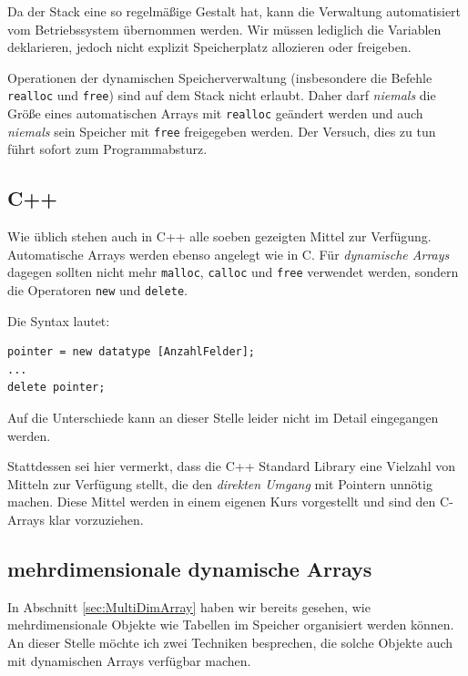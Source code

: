 Da der Stack eine so regelmäßige Gestalt hat, kann die Verwaltung automatisiert vom Betriebssystem übernommen werden. Wir müssen lediglich die Variablen deklarieren, jedoch nicht explizit Speicherplatz allozieren oder freigeben.

\begin{warnbox}
Operationen der dynamischen Speicherverwaltung (insbesondere die Befehle \texttt{realloc} und \texttt{free}) sind auf dem Stack nicht erlaubt. Daher darf \emph{niemals} die Größe eines automatischen Arrays mit \texttt{realloc} geändert werden und auch \emph{niemals} sein Speicher mit \texttt{free} freigegeben werden. Der Versuch, dies zu tun führt sofort zum Programmabsturz.
\end{warnbox}


\subsection{C++} \label{sec:ArrayCPP}
\begin{plusbox}
Wie üblich stehen auch in C++ alle soeben gezeigten Mittel zur Verfügung. Automatische Arrays werden ebenso angelegt wie in C. Für \emph{dynamische Arrays} dagegen sollten nicht mehr \texttt{malloc}, \texttt{calloc} und \texttt{free} verwendet werden, sondern die Operatoren \texttt{new} und \texttt{delete}.

Die Syntax lautet:

\begin{codebox}
\begin{verbatim}
pointer = new datatype [AnzahlFelder];
...
delete pointer;
\end{verbatim}
\end{codebox}

Auf die Unterschiede kann an dieser Stelle leider nicht im Detail eingegangen werden.

Stattdessen sei hier vermerkt, dass die C++ Standard Library eine Vielzahl von Mitteln zur Verfügung stellt, die den \emph{direkten Umgang} mit Pointern unnötig machen. Diese Mittel werden in einem eigenen Kurs vorgestellt und sind den C-Arrays \idR klar vorzuziehen.
\end{plusbox}

\subsection{mehrdimensionale dynamische Arrays}
In Abschnitt \ref{sec:MultiDimArray} haben wir bereits gesehen, wie mehrdimensionale Objekte wie Tabellen im Speicher organisiert werden können. An dieser Stelle möchte ich zwei Techniken besprechen, die solche Objekte auch mit dynamischen Arrays verfügbar machen.

